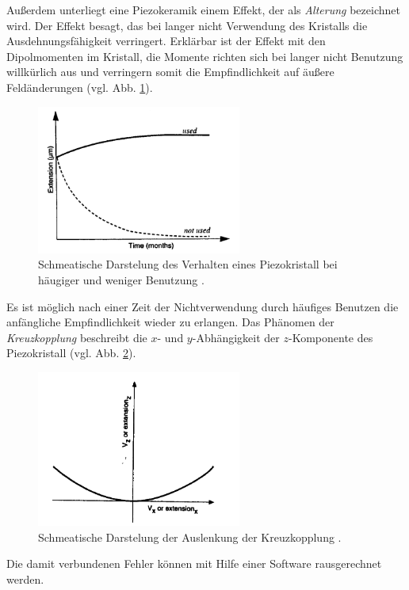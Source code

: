Außerdem unterliegt eine Piezokeramik einem Effekt, der als \emph{Alterung} bezeichnet wird. Der Effekt besagt,
das bei langer nicht Verwendung des Kristalls die Ausdehnungsfähigkeit verringert. Erklärbar ist der Effekt mit den %
Dipolmomenten im Kristall, die Momente richten sich bei langer nicht Benutzung willkürlich aus und verringern %
somit die Empfindlichkeit auf äußere Feldänderungen (vgl. Abb. \ref{fig: ageing}).
\begin{figure}[!h]
  \centering
  \includegraphics[width=0.6\textwidth]{./pics/ageing.png}
  \caption{Schmeatische Darstelung des Verhalten eines Piezokristall bei häugiger und weniger Benutzung \cite{rtm}.} %
  \label{fig: ageing}
\end{figure}
Es ist möglich nach einer Zeit der Nichtverwendung
durch häufiges Benutzen die anfängliche Empfindlichkeit wieder zu erlangen.
Das Phänomen der \emph{Kreuzkopplung} beschreibt die $x$- und $y$-Abhängigkeit der $z$-Komponente des Piezokristall (vgl. Abb. \ref{fig: cross_copeling}). %
\begin{figure}[!h]
  \centering
  \includegraphics[width=0.6\textwidth]{./pics/cross_copling.png}
  \caption{Schmeatische Darstelung der Auslenkung der Kreuzkopplung \cite{rtm}.}
  \label{fig: cross_copeling}
\end{figure}
Die damit verbundenen Fehler können mit Hilfe einer Software rausgerechnet werden. %

